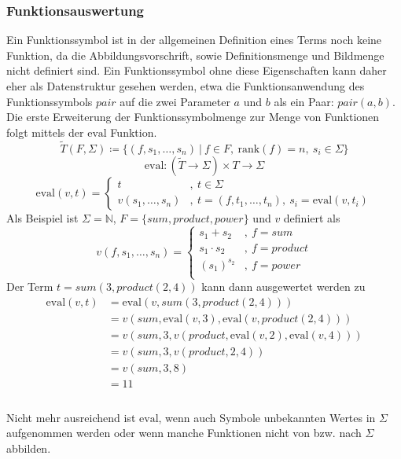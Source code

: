 \documentclass{article}
\begin{document}
\subsubsection{Funktionsauswertung}
Ein Funktionssymbol ist in der allgemeinen Definition eines Terms noch keine Funktion, da die Abbildungsvorschrift, sowie Definitionsmenge und Bildmenge nicht definiert sind. Ein Funktionssymbol ohne diese Eigenschaften kann daher eher als Datenstruktur gesehen werden, etwa die Funktionsanwendung des Funktionssymbols $pair$ auf die zwei Parameter $a$ und $b$ als ein Paar: $pair(a, b)$.\\
Die erste Erweiterung der Funktionssymbolmenge zur Menge von Funktionen folgt mittels der $\mathrm{eval}$ Funktion.
$$\tilde{T}(F, \Sigma) \coloneqq \{(f, s_1, \dots, s_n)~|~f \in F,~\mathrm{rank}(f) = n,~s_i \in \Sigma\}$$
$$\mathrm{eval} \colon (\tilde{T} \rightarrow \Sigma) \times T \rightarrow \Sigma$$
$$\mathrm{eval}(v, t) = \begin{cases} 
            t &,~ t\in \Sigma \\
            v(s_1, \dots, s_n) &,~ t = (f, t_1, \dots , t_n), ~s_i = \mathrm{eval}(v, t_i)
            \end{cases}$$
Als Beispiel ist $\Sigma = \mathbb{N}$, $F = \{sum, product, power\}$ und $v$ definiert als
$$v(f, s_1, \dots, s_n) = \begin{cases}
s_1 + s_2 &,~ f = sum\\
s_1 \cdot s_2 &,~ f = product\\
(s_1)^{s_2} &,~ f = power\\
\end{cases}$$
Der Term $t = sum(3, product(2, 4))$ kann dann ausgewertet werden zu 
\begin{equation}
    \begin{split}
    \mathrm{eval}(v, t) &= \mathrm{eval}(v, sum(3, product(2, 4))) \\
    &= v(sum, \mathrm{eval}(v, 3), \mathrm{eval}(v, product(2, 4))) \\
    &= v(sum, 3, v(product, \mathrm{eval}(v, 2), \mathrm{eval}(v, 4))) \\
    &= v(sum, 3, v(product, 2, 4)) \\
    &= v(sum, 3, 8) \\
    &= 11 \\
    \end{split}
\end{equation}
\\
Nicht mehr ausreichend ist $\mathrm{eval}$, wenn auch Symbole unbekannten Wertes in $\Sigma$ aufgenommen werden oder wenn manche Funktionen nicht von bzw. nach $\Sigma$ abbilden. 
\end{document}
